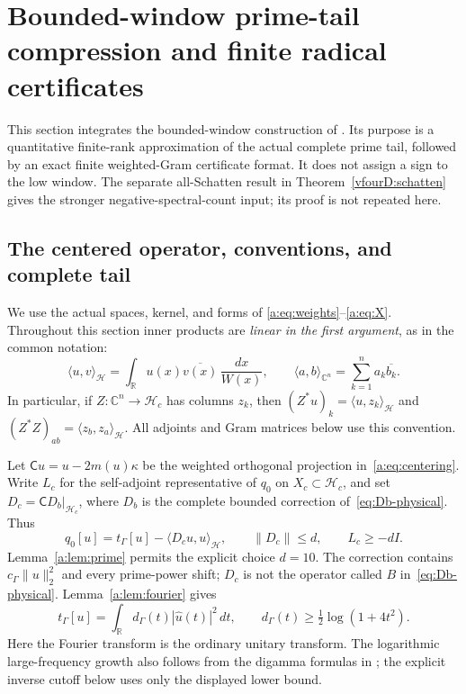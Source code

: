 \documentclass[11pt,a4paper]{article}
\numberwithin{equation}{section}
\theoremstyle{definition}\newtheorem{definition}[theorem]{Definition}
\theoremstyle{remark}\newtheorem{remark}[theorem]{Remark}
\newcommand{\R}{\mathbb R}\newcommand{\C}{\mathbb C}\newcommand{\N}{\mathbb N}
\newcommand{\Hh}{\mathcal H}\newcommand{\Hw}{\mathcal H}
\newcommand{\tg}{t_\Gamma}\newcommand{\cg}{c_\Gamma}
\newcommand{\ip}[2]{\langle#1,#2\rangle}\newcommand{\norm}[1]{\lVert#1\rVert}\newcommand{\abs}[1]{\lvert#1\rvert}
\begin{document}
\section{Bounded-window prime-tail compression and finite radical certificates}
\label{vfourB:sec}\label{vfourB:section}

This section integrates the bounded-window construction of
\cite{vfourLowWindow}. Its purpose is a quantitative finite-rank
approximation of the actual complete prime tail, followed by an exact
finite weighted-Gram certificate format. It does not assign a sign to the
low window. The separate all-Schatten result in
Theorem~\ref{vfourD:schatten} gives the stronger negative-spectral-count
input; its proof is not repeated here.

\subsection{The centered operator, conventions, and complete tail}
\label{vfourB:setting}

We use the actual spaces, kernel, and forms of
\eqref{a:eq:weights}--\eqref{a:eq:X}. Throughout this section inner products
are \emph{linear in the first argument}, as in the common notation:
\[
 \ip{u}{v}_{\Hh}=\int_{\R}u(x)\overline{v(x)}\,\frac{dx}{W(x)},
 \qquad \ip{a}{b}_{\C^n}=\sum_{k=1}^n a_k\overline{b_k}.
\]
In particular, if $Z:\C^n\to\Hh_c$ has columns $z_k$, then
$(Z^*u)_k=\ip{u}{z_k}_{\Hh}$ and
$(Z^*Z)_{ab}=\ip{z_b}{z_a}_{\Hh}$. All adjoints and Gram matrices below
use this convention.

Let $\mathsf C u=u-2m(u)\kappa$ be the weighted orthogonal projection
in~\eqref{a:eq:centering}. Write $L_c$ for the self-adjoint representative
of $q_0$ on $X_c\subset\Hh_c$, and set
$D_c=\mathsf C D_b|_{\Hh_c}$, where $D_b$ is the complete bounded
correction of~\eqref{eq:Db-physical}. Thus
\begin{equation}\label{vfourB:centered-form}
 q_0[u]=\tg[u]-\ip{D_cu}{u}_{\Hh},\qquad
 \norm{D_c}\le d,\qquad L_c\ge-dI.
\end{equation}
Lemma~\ref{a:lem:prime} permits the explicit choice $d=10$.
The correction contains $\cg\norm u_2^2$ and every prime-power shift;
$D_c$ is not the operator called $B$ in~\eqref{eq:Db-physical}.
Lemma~\ref{a:lem:fourier} gives
\begin{equation}\label{vfourB:gamma}
 \tg[u]=\int_{\R}d_\Gamma(t)|\widehat u(t)|^2\,dt,
 \qquad d_\Gamma(t)\ge\tfrac12\log(1+4t^2).
\end{equation}
Here the Fourier transform is the ordinary unitary transform.
The logarithmic large-frequency growth also follows from the digamma
formulas in \cite[Sections 5.9 and 5.11]{DLMF}; the explicit inverse cutoff
below uses only the displayed lower bound.
\end{document}
